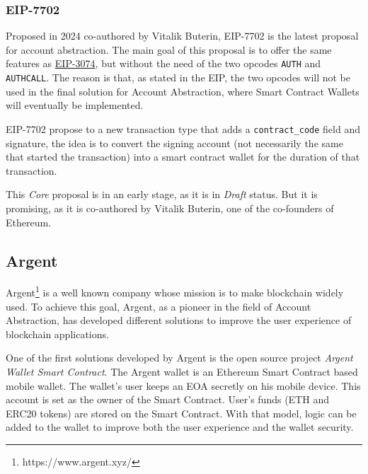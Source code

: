\subsubsection{EIP-7702}
\label{subsubsec:erc-7702}

Proposed in 2024 co-authored by Vitalik Buterin, EIP-7702 is the latest proposal for account abstraction. The main goal of this proposal is to offer the same features as \hyperref[subsubsec:eip-3074]{EIP-3074}, but without the need of the two opcodes \texttt{AUTH} and \texttt{AUTHCALL}. The reason is that, as stated in the EIP, the two opcodes will not be used in the final solution for Account Abstraction, where Smart Contract Wallets will eventually be implemented. \cite{eip-7702}

EIP-7702 propose to a new transaction type that adds a \texttt{contract\_code} field and signature, the idea is to convert the signing account (not necessarily the same that started the transaction) into a smart contract wallet for the duration of that transaction. \cite{eip-7702}

This \textit{Core} proposal is in an early stage, as it is in \textit{Draft} status. But it is promising, as it is co-authored by Vitalik Buterin, one of the co-founders of Ethereum.

\subsection{Argent}
\label{subsec:argent}

Argent\footnote{https://www.argent.xyz/} is a well known company whose mission is to make blockchain widely used. To achieve this goal, Argent, as a pioneer in the field of Account Abstraction, has developed different solutions to improve the user experience of blockchain applications. \cite{argent-aa}

One of the first solutions developed by Argent is the open source project \textit{Argent Wallet Smart Contract}. The Argent wallet is an Ethereum Smart Contract based mobile wallet. The wallet's user keeps an EOA secretly on his mobile device. This account is set as the owner of the Smart Contract. User's funds (ETH and ERC20 tokens) are stored on the Smart Contract. With that model, logic can be added to the wallet to improve both the user experience and the wallet security. \cite{argent-github}



